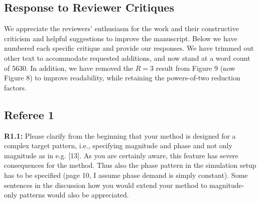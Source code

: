 \documentclass[11pt]{article}
\newcommand{\mysubsectionstar}[1]{\vspace{0mm}\subsection*{#1}\vspace{0mm}}
\begin{document}


\onecolumn

\setlength{\parskip}{0pt}

\clearpage
\newpage
\pagestyle{empty}		%

\footskip 15pt

\mysubsectionstar{Response to Reviewer Critiques}
We appreciate the reviewers' enthusiasm for the work and their constructive criticism and helpful suggestions to improve the manuscript.
Below we have numbered each specific critique and provide our responses.
We have trimmed out other text to accommodate requested additions, 
and now stand at a word count of 5630. 
In addition, we have removed the $R = 3$ result from Figure 9 (now Figure 8) to improve readability,
while retaining the powers-of-two reduction factors.

\mysubsectionstar{Referee 1}
{\bf R1.1:} Please clarify from the beginning that your method is designed for a complex target pattern, i.e., specifying magnitude and phase and not only magnitude as in e.g. [13]. As you are certainly aware, this feature has severe consequences for the method. Thus also the phase pattern in the simulation setup has to be specified (page 10, I assume phase demand is simply constant). Some sentences in the discussion how you would extend your method to magnitude-only patterns would also be appreciated.
\\[0.2em] 
\\[1.2em]
\end{document}
